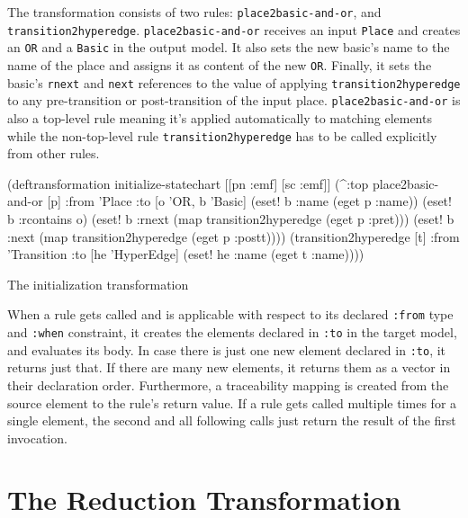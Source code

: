 \documentclass[submission]{eptcs}
\begin{document}
The transformation consists of two rules: \verb|place2basic-and-or|, and
\verb|transition2hyperedge|.  \verb|place2basic-and-or| receives an input
\verb|Place| and creates an \verb|OR| and a \verb|Basic| in the output model.
It also sets the new basic's name to the name of the place and assigns it as
content of the new \verb|OR|.  Finally, it sets the basic's \verb|rnext| and
\verb|next| references to the value of applying \verb|transition2hyperedge| to
any pre-transition or post-transition of the input place.
\verb|place2basic-and-or| is also a top-level rule meaning it's applied
automatically to matching elements while the non-top-level rule
\verb|transition2hyperedge| has to be called explicitly from other rules.

\begin{listing}[H]
  \begin{clojurecode}
(deftransformation initialize-statechart [[pn :emf] [sc :emf]]
  (^:top place2basic-and-or [p]
         :from 'Place
         :to [o 'OR, b 'Basic]
         (eset! b :name (eget p :name))
         (eset! b :rcontains o)
         (eset! b :rnext (map transition2hyperedge
                              (eget p :pret)))
         (eset! b :next  (map transition2hyperedge
                              (eget p :postt))))
  (transition2hyperedge [t]
         :from 'Transition
         :to [he 'HyperEdge]
         (eset! he :name (eget t :name))))
  \end{clojurecode}
  \label{lst:init}
  \caption{The initialization transformation}
\end{listing}

When a rule gets called and is applicable with respect to its declared
\verb|:from| type and \verb|:when| constraint, it creates the elements declared
in \verb|:to| in the target model, and evaluates its body.  In case there is
just one new element declared in \verb|:to|, it returns just that.  If there
are many new elements, it returns them as a vector in their declaration order.
Furthermore, a traceability mapping is created from the source element to the
rule's return value.  If a rule gets called multiple times for a single
element, the second and all following calls just return the result of the first
invocation.


\section{The Reduction Transformation}
\label{sec:reduction-transformation}
\end{document}
